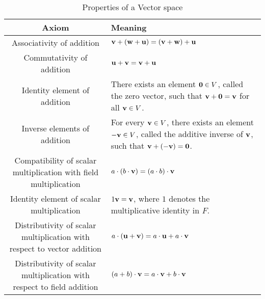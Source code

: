 \begin{definition}[Vektorräume]
\begin{table}[!ht]
\begin{tabularx}{\textwidth}{C X}
			\toprule
			\textbf{Axiom}                                                          & \textbf{Meaning}                                                                                                                                     \\ \midrule
			Associativity of addition                                               & $\mathbf{v}+(\mathbf{w}+\mathbf{u}) = (\mathbf{v} + \mathbf{w}) + \mathbf{u}$                                                                                                \\
			Commutativity of addition                                               & $\mathbf{u} + \mathbf{v} = \mathbf{v} + \mathbf{u}$                                                                                                                  \\
			Identity element of addition                                            & There exists an element $\mathbf{0} \in V$, called the zero vector, such that $\mathbf{v} + \mathbf{0} = \mathbf{v}$ for all $\mathbf{v} \in V$.                         \\
			Inverse elements of addition                                            & For every $\mathbf{v} \in V$, there exists an element $\mathbf{-v} \in V$, called the additive inverse of $\mathbf{v}$, such that $\mathbf{v} + (\mathbf{-v}) = \mathbf{0}$. \\
			Compatibility of scalar multiplication with field multiplication        & $a\cdot(b\cdot\mathbf{v}) = (a\cdot b)\cdot\mathbf{v}$                                                                                                      \\
			Identity element of scalar multiplication                               & $1\mathbf{v} = \mathbf{v}$, where $1$ denotes the multiplicative identity in $F$.                                                                            \\
			Distributivity of scalar multiplication with respect to vector addition & $a\cdot(\mathbf{u} + \mathbf{v}) = a\cdot\mathbf{u} + a\cdot\mathbf{v}$                                                                                              \\
			Distributivity of scalar multiplication with respect to field addition  & $(a + b)\cdot\mathbf{v} = a\cdot\mathbf{v} + b\cdot\mathbf{v}$                                                                                                   \\ \bottomrule
		\end{tabularx}
		\caption{Properties of a Vector space}
	\end{table}
\end{definition}
